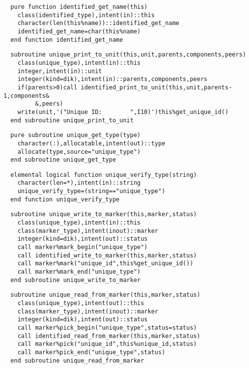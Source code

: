 \begin{Verbatim}
  pure function identified_get_name(this)
    class(identified_type),intent(in)::this
    character(len(this%name))::identified_get_name
    identified_get_name=char(this%name)
  end function identified_get_name
\end{Verbatim}

\begin{Verbatim}
  subroutine unique_print_to_unit(this,unit,parents,components,peers)
    class(unique_type),intent(in)::this
    integer,intent(in)::unit
    integer(kind=dik),intent(in)::parents,components,peers
    if(parents>0)call identified_print_to_unit(this,unit,parents-1,components&
         &,peers)
    write(unit,'("Unique ID:        ",I10)')this%get_unique_id()
  end subroutine unique_print_to_unit
\end{Verbatim}

\begin{Verbatim}
  pure subroutine unique_get_type(type)
    character(:),allocatable,intent(out)::type
    allocate(type,source="unique_type")
  end subroutine unique_get_type
\end{Verbatim}

\begin{Verbatim}
  elemental logical function unique_verify_type(string)
    character(len=*),intent(in)::string
    unique_verify_type=(string=="unique_type")
  end function unique_verify_type
\end{Verbatim}

\begin{Verbatim}
  subroutine unique_write_to_marker(this,marker,status)
    class(unique_type),intent(in)::this
    class(marker_type),intent(inout)::marker
    integer(kind=dik),intent(out)::status
    call marker%mark_begin("unique_type")
    call identified_write_to_marker(this,marker,status)
    call marker%mark("unique_id",this%get_unique_id())
    call marker%mark_end("unique_type")
  end subroutine unique_write_to_marker
\end{Verbatim}

\begin{Verbatim}
  subroutine unique_read_from_marker(this,marker,status)
    class(unique_type),intent(out)::this
    class(marker_type),intent(inout)::marker
    integer(kind=dik),intent(out)::status
    call marker%pick_begin("unique_type",status=status)    
    call identified_read_from_marker(this,marker,status)
    call marker%pick("unique_id",this%unique_id,status)
    call marker%pick_end("unique_type",status)
  end subroutine unique_read_from_marker
\end{Verbatim}

